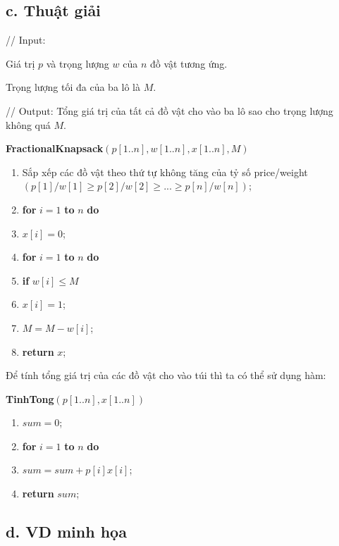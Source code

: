 \documentclass[12pt, a4paper, fleqn]{article}
\begin{document}
	\subsection*{c. Thuật giải}
	
	\clearpage
	
	// Input:
	
	Giá trị $p$ và trọng lượng $w$ của $n$ đồ vật tương ứng.
	
	Trọng lượng tối đa của ba lô là $M$.
	
	// Output: Tổng giá trị của tất cả đồ vật cho vào ba lô sao cho trọng lượng không quá $M$.
	
	\textbf{FractionalKnapsack}$(p[1..n], w[1..n], x[1..n], M)$
	\begin{enumerate}
		\item Sắp xếp các đồ vật theo thứ tự không tăng của tỷ số price/weight $(p[1] / w[1] \geq p[2] / w[2] \geq ... \geq p[n] / w[n])$;
		\item \textbf{for} $i = 1$ \textbf{to} $n$ \textbf{do}
		\item \qquad $x[i] = 0$;
		\item \textbf{for} $i = 1$ \textbf{to} $n$ \textbf{do}
		\item \qquad \textbf{if} $w[i] \leq M$
		\item \qquad \qquad $x[i] = 1$;
		\item \qquad \qquad $M = M - w[i]$;
		\item \textbf{return} $x$;
	\end{enumerate}
	
	Để tính tổng giá trị của các đồ vật cho vào túi thì ta có thể sử dụng hàm:
	
	\textbf{TinhTong}$(p[1..n], x[1..n])$
	\begin{enumerate}
		\item $sum = 0$;
		\item \textbf{for} $i = 1$ \textbf{to} $n$ \textbf{do}
		\item \qquad $sum = sum + p[i]x[i]$;
		\item \textbf{return} $sum$;
	\end{enumerate}
	
	\subsection*{d. VD minh họa}
	
\end{document}
